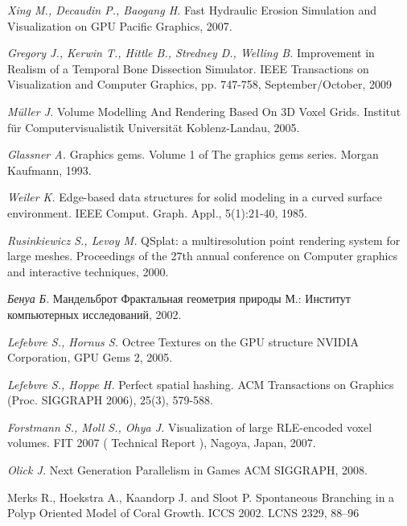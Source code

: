 \begin{thebibliography}{99}

    \emph{Xing M., Decaudin P., Baogang H.} Fast Hydraulic Erosion Simulation and Visualization on GPU
    Pacific Graphics, 2007.

    \emph{Gregory J., Kerwin T., Hittle B., Stredney D., Welling B.} Improvement in Realism of a Temporal Bone Dissection Simulator.
    IEEE Transactions on Visualization and Computer Graphics, pp. 747-758, September/October, 2009

    \emph{Müller J.} Volume Modelling And Rendering Based On 3D Voxel Grids.
    Institut für Computervisualistik Universität Koblenz-Landau, 2005.

    \emph{Glassner A.} Graphics gems. Volume 1 of The graphics gems series.
    Morgan Kaufmann, 1993.

    \emph{Weiler K.} Edge-based data structures for solid modeling in a curved surface environment. 
    IEEE Comput. Graph. Appl., 5(1):21-40, 1985.

    \emph{Rusinkiewicz S., Levoy M.} QSplat: a multiresolution point rendering system for large meshes.
    Proceedings of the 27th annual conference on Computer graphics and interactive techniques, 2000.
   
    \emph{Бенуа Б.} Мандельброт Фрактальная геометрия природы
    М.: Институт компьютерных исследований, 2002.

    \emph{Lefebvre S., Hornus S.} Octree Textures on the GPU structure
    NVIDIA Corporation, GPU Gems 2, 2005.

    \emph{Lefebvre S., Hoppe H.} Perfect spatial hashing.
    ACM Transactions on Graphics (Proc. SIGGRAPH 2006), 25(3), 579-588.

    \emph{Forstmann S., Moll S., Ohya J.} Visualization of large RLE-encoded voxel volumes.
    FIT 2007 ( Technical Report ), Nagoya, Japan, 2007.

    \emph{Olick J.} Next Generation Parallelism in Games 
    ACM SIGGRAPH, 2008.

    Merks R., Hoekstra A., Kaandorp J. and Sloot P. Spontaneous Branching in a Polyp Oriented Model of Coral Growth.
    ICCS 2002. LCNS 2329, 88–96


\end{thebibliography}
